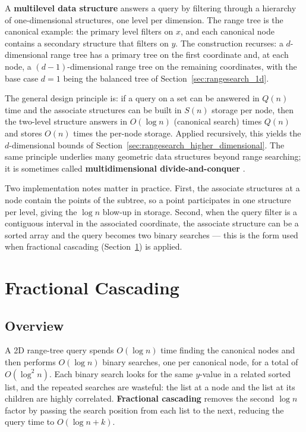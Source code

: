 A \textbf{multilevel data structure}
answers a query by filtering through a hierarchy of one-dimensional
structures, one level per dimension. The range tree is the canonical
example: the primary level filters on $x$, and each canonical node contains
a secondary structure that filters on $y$. The construction recurses: a
$d$-dimensional range tree has a primary tree on the first coordinate and,
at each node, a $(d-1)$-dimensional range tree on the remaining
coordinates, with the base case $d=1$ being the balanced tree of
Section~\ref{sec:rangesearch_1d}.

The general design principle is: if a query on a set can be answered in
$Q(n)$ time and the associate structures can be built in $S(n)$ storage per
node, then the two-level structure answers in $O(\log n)$ (canonical
search) times $Q(n)$ and stores $O(n)$ times the per-node storage. Applied
recursively, this yields the $d$-dimensional bounds of
Section~\ref{sec:rangesearch_higher_dimensional}. The same principle
underlies many geometric data structures beyond range searching; it is
sometimes called \textbf{multidimensional divide-and-conquer}
\cite{bentley1980multidim}.

Two implementation notes matter in practice. First, the associate structures
at a node contain the points of the subtree, so a point participates in one
structure per level, giving the $\log n$ blow-up in storage. Second, when
the query filter is a contiguous interval in the associated coordinate, the
associate structure can be a sorted array and the query becomes two binary
searches --- this is the form used when fractional cascading
(Section~\ref{sec:rangesearch_fractional_cascading}) is applied.


\section{Fractional Cascading}
\label{sec:rangesearch_fractional_cascading}

\subsection{Overview}

A 2D range-tree query spends $O(\log n)$ time finding the canonical nodes
and then performs $O(\log n)$ binary searches, one per canonical node, for a
total of $O(\log^2 n)$. Each binary search looks for the same $y$-value in a
related sorted list, and the repeated searches are wasteful: the list at a
node and the list at its children are highly correlated. \textbf{Fractional
cascading} removes the second $\log n$ factor
by passing the search position from each list to the next, reducing the
query time to $O(\log n + k)$.

